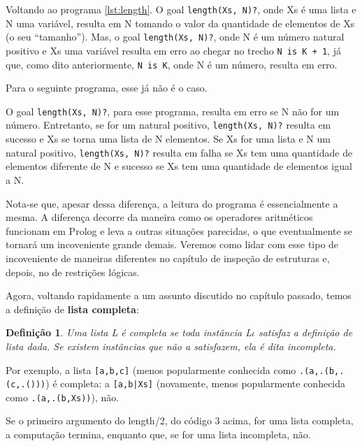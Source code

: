 \documentclass{article}
\newtheorem{definition}{Definição}[section]
\theoremstyle{remark}
\begin{document}
Voltando ao programa \ref{lst:length}. %
O goal {\tt length(Xs, N)?}, onde Xs é uma lista e N uma variável, resulta em N tomando o valor da quantidade de elementos de Xs (o seu ``tamanho'').  Mas, o goal {\tt length(Xs, N)?}, onde N é um número natural positivo e Xs uma variável resulta em erro ao chegar no trecho {\tt N is K + 1}, já que, como dito anteriormente, {\tt N is K}, onde N é um número, resulta em erro.

Para o seguinte programa, esse já não é o caso.


O goal {\tt length(Xs, N)?}, para esse programa, resulta em erro se N não for um número. Entretanto, se for um natural positivo, {\tt length(Xs, N)?} resulta em sucesso e Xs se torna uma lista de N elementos. Se Xs for uma lista e N um natural positivo, {\tt length(Xs, N)?} resulta em falha se Xs tem uma quantidade de elementos diferente de N e sucesso se Xs tem uma quantidade de elementos igual a N.

Nota-se que, apesar dessa diferença, a leitura do programa é essencialmente a mesma. A diferença decorre da maneira como os operadores aritméticos funcionam em Prolog e leva a outras situações parecidas, o que eventualmente se tornará um incoveniente grande demais. Veremos como lidar com esse tipo de incoveniente de maneiras diferentes no capítulo de inspeção de estruturas %
e, depois, no de restrições lógicas. %

Agora, voltando rapidamente a um assunto discutido no capítulo passado, temos a definição de \textbf{lista completa}:

\begin{definition} Uma lista L é completa se toda instância L$\iota$ satisfaz a definição de lista dada. Se existem instâncias que não a satisfazem, ela é dita incompleta.
\end{definition}

Por exemplo, a lista {\tt[a,b,c]} (menos popularmente conhecida como {\tt .(a,.(b,.(c,.()))}) é completa: a {\tt[a,b|Xs]} (novamente, menos popularmente conhecida como {\tt .(a,.(b,Xs))}), não.

Se o primeiro argumento do length/2, do código 3 acima, for uma lista completa, a computação termina, enquanto que, se for uma lista incompleta, não.
\end{document}
